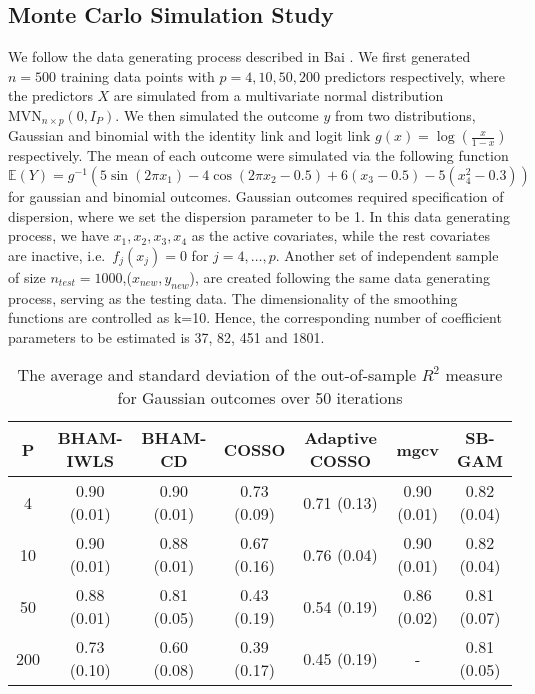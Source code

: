 \documentclass[AMA,STIX1COL,]{WileyNJD-v2}
\begin{document}
\hypertarget{monte-carlo-simulation-study}{%
\subsection{Monte Carlo Simulation
Study}\label{monte-carlo-simulation-study}}

We follow the data generating process described in Bai \citep{Bai2021}.
We first generated \(n=500\) training data points with
\(p=4, 10, 50, 200\) predictors respectively, where the predictors \(X\)
are simulated from a multivariate normal distribution
\(\text{MVN}_{n\times p}(0, I_{P})\). We then simulated the outcome
\(y\) from two distributions, Gaussian and binomial with the identity
link and logit link \(g(x) = \log(\frac{x}{1-x})\) respectively. The
mean of each outcome were simulated via the following function \[
\mathbb{E}(Y) = g^{-1}(5 \sin(2\pi x_1) - 4 \cos(2\pi x_2 -0.5) + 6(x_3-0.5) - 5(x_4^2 -0.3))
\] for gaussian and binomial outcomes. Gaussian outcomes required
specification of dispersion, where we set the dispersion parameter to be
1. In this data generating process, we have \(x_1, x_2, x_3, x_4\) as
the active covariates, while the rest covariates are inactive,
i.e.~\(f_j(x_j) = 0\) for \(j = 4, \dots, p\). Another set of
independent sample of size \(n_{test}=1000\),(\(x_{new} ,y_{new}\)), are
created following the same data generating process, serving as the
testing data. The dimensionality of the smoothing functions are
controlled as k=10. Hence, the corresponding number of coefficient
parameters to be estimated is 37, 82, 451 and 1801.

\begin{table}[ht]
\centering
\begin{tabular}{ccccccc}
  \hline
P & BHAM-IWLS & BHAM-CD & COSSO & Adaptive COSSO & mgcv & SB-GAM \\ 
  \hline
  4 & 0.90 (0.01) & 0.90 (0.01) & 0.73 (0.09) & 0.71 (0.13) & 0.90 (0.01) & 0.82 (0.04) \\ 
   10 & 0.90 (0.01) & 0.88 (0.01) & 0.67 (0.16) & 0.76 (0.04) & 0.90 (0.01) & 0.82 (0.04) \\ 
   50 & 0.88 (0.01) & 0.81 (0.05) & 0.43 (0.19) & 0.54 (0.19) & 0.86 (0.02) & 0.81 (0.07) \\ 
  200 & 0.73 (0.10) & 0.60 (0.08) & 0.39 (0.17) & 0.45 (0.19) & - & 0.81 (0.05) \\ 
   \hline
\end{tabular}
\caption{The average and standard deviation of the out-of-sample $R^2$ measure for Gaussian outcomes over 50 iterations} 
\label{tab:gaus}
\end{table}
\end{document}
